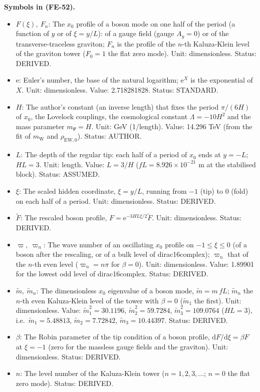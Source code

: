 \documentclass[
  10pt,
]{article}
\providecommand{\tightlist}{%
  \setlength{\itemsep}{0pt}\setlength{\parskip}{0pt}}
\begin{document}
\textbf{Symbols in (FE-52).}

\begin{itemize}
\tightlist
\item
  \(F(\xi),\ F_n\): The \(x_0\) profile of a boson mode on one half of
  the period (a function of \(y\) or of \(\xi = y/L\)): of a gauge field
  (gauge \(A_y = 0\)) or of the transverse-traceless graviton; \(F_n\)
  is the profile of the \(n\)-th Kaluza-Klein level of the graviton
  tower (\(F_0 = 1\) the flat zero mode). Unit: dimensionless. Status:
  DERIVED.
\item
  \(\mathrm{e}\): Euler's number, the base of the natural logarithm;
  \(\mathrm{e}^{X}\) is the exponential of \(X\). Unit: dimensionless.
  Value: 2.718281828. Status: STANDARD.
\item
  \(H\): The author's constant (an inverse length) that fixes the period
  \(\pi/(6H)\) of \(x_0\), the Lovelock couplings, the cosmological
  constant \(\Lambda = -10H^2\) and the mass parameter \(m_\Psi = H\).
  Unit: GeV (1/length). Value: 14.296 TeV (from the fit of
  \(m_{\mathrm{W}}\) and \(\rho_{\mathrm{EW},0}\)). Status: AUTHOR.
\item
  \(L\): The depth of the regular tip: each half of a period of \(x_0\)
  ends at \(y = -L\); \(HL = 3\). Unit: length. Value: \(L = 3/H\)
  (\(fL = 8.926\times10^{-21}\) m at the stabilised block). Status:
  ASSUMED.
\item
  \(\xi\): The scaled hidden coordinate, \(\xi = y/L\), running from
  \(-1\) (tip) to \(0\) (fold) on each half of a period. Unit:
  dimensionless. Status: DERIVED.
\item
  \(\tilde F\): The rescaled boson profile,
  \(F = \mathrm{e}^{-3HL\xi/2}\tilde F\). Unit: dimensionless. Status:
  DERIVED.
\item
  \(\varpi,\ \varpi_n\): The wave number of an oscillating \(x_0\)
  profile on \(-1 \le \xi \le 0\) (of a boson after the rescaling, or of
  a bulk level of dirac16complex); \(\varpi_n\) that of the \(n\)-th
  even level (\(\varpi_n = n\pi\) for \(\beta = 0\)). Unit:
  dimensionless. Value: 1.89901 for the lowest odd level of
  dirac16complex. Status: DERIVED.
\item
  \(\tilde m,\ \tilde m_n\): The dimensionless \(x_0\) eigenvalue of a
  boson mode, \(\tilde m = m\,fL\); \(\tilde m_n\) the \(n\)-th even
  Kaluza-Klein level of the tower with \(\beta = 0\) (\(\tilde m_1\) the
  first). Unit: dimensionless. Value: \(\tilde m_1^2 = 30.1196\),
  \(\tilde m_2^2 = 59.7284\), \(\tilde m_3^2 = 109.0764\) (\(HL = 3\)),
  i.e.~\(\tilde m_1 = 5.48813\), \(\tilde m_2 = 7.72842\),
  \(\tilde m_3 = 10.44397\). Status: DERIVED.
\item
  \(\beta\): The Robin parameter of the tip condition of a boson
  profile, \(\mathrm{d}F/\mathrm{d}\xi = \beta F\) at \(\xi = -1\) (zero
  for the massless gauge fields and the graviton). Unit: dimensionless.
  Status: DERIVED.
\item
  \(n\): The level number of the Kaluza-Klein tower
  (\(n = 1, 2, 3, \dots\); \(n = 0\) the flat zero mode). Status:
  DERIVED.
\end{itemize}
\end{document}
